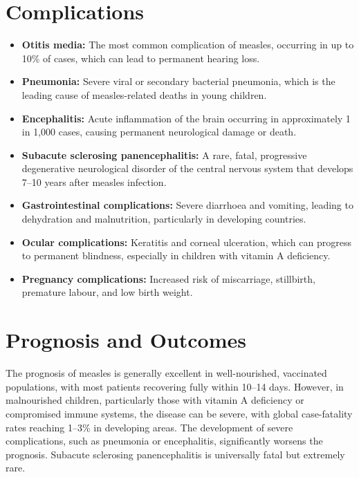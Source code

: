 \section*{Complications}
\begin{itemize}
    \item \textbf{Otitis media:} The most common complication of measles, occurring in up to 10\% of cases, which can lead to permanent hearing loss.
    \item \textbf{Pneumonia:} Severe viral or secondary bacterial pneumonia, which is the leading cause of measles-related deaths in young children.
    \item \textbf{Encephalitis:} Acute inflammation of the brain occurring in approximately 1 in 1,000 cases, causing permanent neurological damage or death.
    \item \textbf{Subacute sclerosing panencephalitis:} A rare, fatal, progressive degenerative neurological disorder of the central nervous system that develops 7--10 years after measles infection.
    \item \textbf{Gastrointestinal complications:} Severe diarrhoea and vomiting, leading to dehydration and malnutrition, particularly in developing countries.
    \item \textbf{Ocular complications:} Keratitis and corneal ulceration, which can progress to permanent blindness, especially in children with vitamin A deficiency.
    \item \textbf{Pregnancy complications:} Increased risk of miscarriage, stillbirth, premature labour, and low birth weight.
\end{itemize}

\section*{Prognosis and Outcomes}
The prognosis of measles is generally excellent in well-nourished, vaccinated populations, with most patients recovering fully within 10--14 days. However, in malnourished children, particularly those with vitamin A deficiency or compromised immune systems, the disease can be severe, with global case-fatality rates reaching 1--3\% in developing areas. The development of severe complications, such as pneumonia or encephalitis, significantly worsens the prognosis. Subacute sclerosing panencephalitis is universally fatal but extremely rare.

